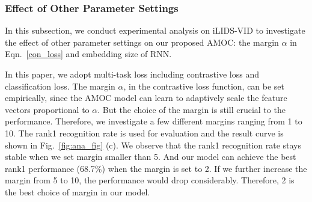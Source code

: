 \documentclass[journal]{IEEEtran}
\begin{document}




\subsubsection{Effect of Other Parameter Settings}
In this subsection, we conduct experimental analysis on iLIDS-VID to investigate the effect of other parameter settings on our proposed AMOC: the margin $\alpha$ in Eqn.~\eqref{con_loss} and embedding size of RNN. 

In this paper, we adopt multi-task loss including contrastive loss and classification loss. The margin $\alpha$, in the contrastive loss function, can be set empirically, since the AMOC model can learn to adaptively scale the feature vectors proportional to $\alpha$. But the choice of the margin is still crucial to the performance. Therefore, we investigate a few different margins ranging from 1 to 10. The rank1 recognition rate is used for evaluation and the result curve is shown in Fig.~\ref{fig:ana_fig} (c). We observe that the rank1 recognition rate stays stable when we set margin smaller than 5. And our model can achieve the best rank1 performance (68.7\%) when the margin is set to 2. If we further increase the margin from 5 to 10, the performance would drop considerably. Therefore, 2 is the best choice of margin in our model. 
\end{document}
